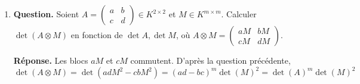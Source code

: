 \documentclass[12pt, a4paper]{article}
\begin{document}
\begin{enumerate}[label=5.\arabic*., start=54]
  \item \begin{minipage}[t]{\linewidth}\raggedright
\textbf{Question.} Soient $A=\begin{pmatrix}a&b\\c&d\end{pmatrix}\in K^{2\times2}$ et $M\in K^{m\times m}$. Calculer $\det(A\otimes M)$ en fonction de $\det A,\det M$, où $A\otimes M=\begin{pmatrix}aM&bM\\cM&dM\end{pmatrix}$.
\par\smallskip
\textbf{Réponse.} Les blocs $aM$ et $cM$ commutent. D'après la question précédente,
    \[
      \det(A\otimes M)=\det(adM^2-cbM^2)
      =(ad-bc)^m\det(M)^2
      =\det(A)^m\det(M)^2
    \]
\end{minipage}

\end{enumerate}
\end{document}
